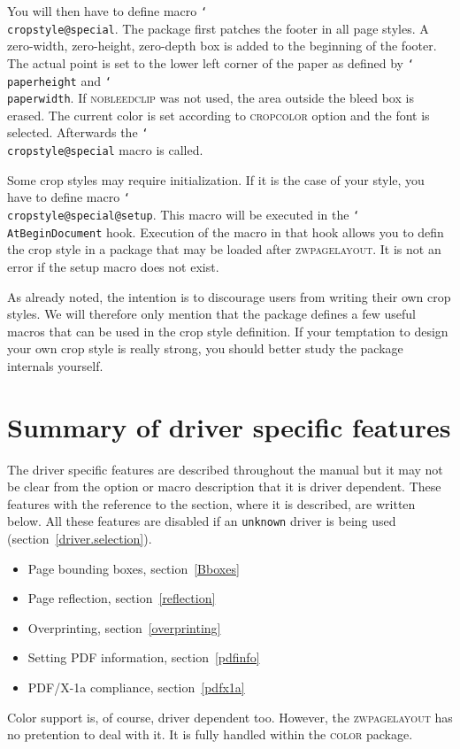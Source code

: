 \documentclass[11pt]{article}
\def\mg#1{\ifvmode\leavevmode\fi\marginpar{\texttt{#1}}\ignorespaces}
\def\cmg#1{\mg{\char`\\#1}}
\def\opt#1{\texorpdfstring{\textmd{\textsc{#1}}}{#1}}
\let\pkg\textsc
\DeclareRobustCommand\cmd[1]{\texttt{\char`\\#1}}
\begin{document}
\cmg{cropstyle@special}
You will then have to define macro \cmd{cropstyle@special}. The package first patches the footer in
all page styles. A zero-width, zero-height, zero-depth box is added to the beginning of the footer.
The actual point is set to the lower left corner of the paper as defined by \cmd{paperheight} and
\cmd{paperwidth}. If \opt{nobleedclip} was not used, the area outside the bleed box is erased. The
current color is set according to \opt{cropcolor} option and the font is selected. Afterwards the
\cmd{cropstyle@special} macro is called.

Some crop styles may require initialization. If it is the case of your style, you have to define
macro \cmd{cropstyle@special@setup}. This macro will be executed in the \cmd{AtBeginDocument} hook.
Execution of the macro in that hook allows you to defin the crop style in a package that may be
loaded after \pkg{zwpagelayout}.
It is not an error if the setup macro does not exist.

As already noted, the intention is to discourage users from writing their own crop styles. We will
therefore only mention that the package defines a few useful macros that can be used in the crop
style definition. If your temptation to design your own crop style is really strong, you should
better study the package internals yourself.

\section{Summary of driver specific features}
The driver specific features are described throughout the manual but it may not be clear from the
option or macro description that it is driver dependent. These features with the reference to the
section, where it is described, are written below. All these features are disabled if an
\texttt{unknown} driver is being used (section~\ref{driver.selection}).
\begin{itemize}
\item Page bounding boxes, section~\ref{Bboxes}
\item Page reflection, section~\ref{reflection}
\item Overprinting, section~\ref{overprinting}
\item Setting PDF information, section~\ref{pdfinfo}
\item PDF/X-1a compliance, section~\ref{pdfx1a}
\end{itemize}
Color support is, of course, driver dependent too. However, the \pkg{zwpagelayout} has no
pretention to deal with it. It is fully handled within the \pkg{color} package.
\end{document}
